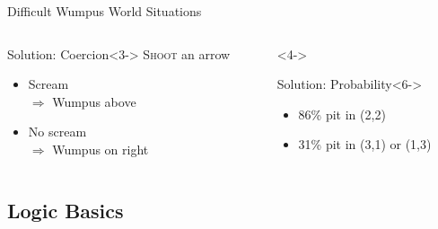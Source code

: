 \documentclass[14pt]{beamer}
\begin{document}
\begin{frame}[label=wumpus-world-difficult]{Difficult Wumpus World Situations}
\begin{columns}
\begin{column}{0.47\textwidth}
\centering
\begin{wumpusgrid}{2}{0.18\textheight}
\end{wumpusgrid}
\begin{block}{Solution: Coercion}<3->
\textsc{Shoot} an arrow
\begin{itemize}
\item Scream \\
$\Rightarrow$ Wumpus above
\item No scream \\
$\Rightarrow$ Wumpus on right
\end{itemize}
\end{block}
\end{column}
\begin{column}{0.47\textwidth}<4->
\centering
\begin{wumpusgrid}{3}{0.18\textheight}
\end{wumpusgrid}
\begin{block}{Solution: Probability}<6->
\begin{itemize}
\item 86\% pit in (2,2) %
\item 31\% pit in (3,1) or (1,3) %
\end{itemize}
\end{block}
\end{column}
\end{columns}
\end{frame}


\subsection{Logic Basics}
\end{document}
